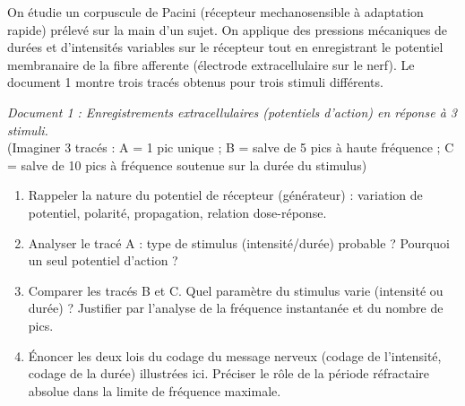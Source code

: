 \documentclass[11pt]{article}
\begin{document}
\begin{exercice}
On étudie un corpuscule de Pacini (récepteur mechanosensible à adaptation rapide) prélevé sur la main d'un sujet. On applique des pressions mécaniques de durées et d'intensités variables sur le récepteur tout en enregistrant le potentiel membranaire de la fibre afferente (électrode extracellulaire sur le nerf).
Le document 1 montre trois tracés obtenus pour trois stimuli différents.
\begin{center}
\textit{Document 1 : Enregistrements extracellulaires (potentiels d'action) en réponse à 3 stimuli.}\\
\small (Imaginer 3 tracés : A = 1 pic unique ; B = salve de 5 pics à haute fréquence ; C = salve de 10 pics à fréquence soutenue sur la durée du stimulus)
\end{center}
\begin{enumerate}
    \item Rappeler la nature du potentiel de récepteur (générateur) : variation de potentiel, polarité, propagation, relation dose-réponse.
    \item Analyser le tracé A : type de stimulus (intensité/durée) probable ? Pourquoi un seul potentiel d'action ?
    \item Comparer les tracés B et C. Quel paramètre du stimulus varie (intensité ou durée) ? Justifier par l'analyse de la fréquence instantanée et du nombre de pics.
    \item Énoncer les deux lois du codage du message nerveux (codage de l'intensité, codage de la durée) illustrées ici. Préciser le rôle de la période réfractaire absolue dans la limite de fréquence maximale.
\end{enumerate}
\end{exercice}
\end{document}
